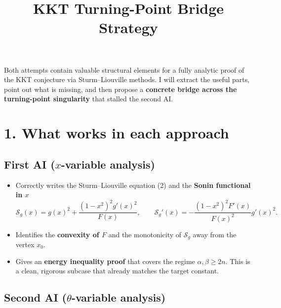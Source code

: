 \documentclass[11pt]{article}
\title{KKT Turning-Point Bridge Strategy}
\author{}
\date{}
\begin{document}
\maketitle
Both attempts contain valuable structural elements for a fully analytic proof of the KKT conjecture via Sturm--Liouville methods. I will extract the useful parts, point out what is missing, and then propose a \textbf{concrete bridge across the turning-point singularity} that stalled the second AI.

\section*{1. What works in each approach}

\subsection*{First AI (\(x\)-variable analysis)}

\begin{itemize}
\item Correctly writes the Sturm--Liouville equation (2) and the \textbf{Sonin functional in \(x\)}
\begin{equation*}
\mathcal{S}_g(x)=g(x)^2+\frac{(1-x^2)^2 g'(x)^2}{F(x)},
\qquad
\mathcal{S}_g'(x)=-\frac{(1-x^2)^2 F'(x)}{F(x)^2}g'(x)^2.
\end{equation*}
\item Identifies the \textbf{convexity of \(F\)} and the monotonicity of \(\mathcal{S}_g\) away from the vertex \(x_0\).
\item Gives an \textbf{energy inequality proof} that covers the regime \(\alpha,\beta\ge 2n\). This is a clean, rigorous subcase that already matches the target constant.
\end{itemize}

\subsection*{Second AI (\(\theta\)-variable analysis)}
\end{document}
